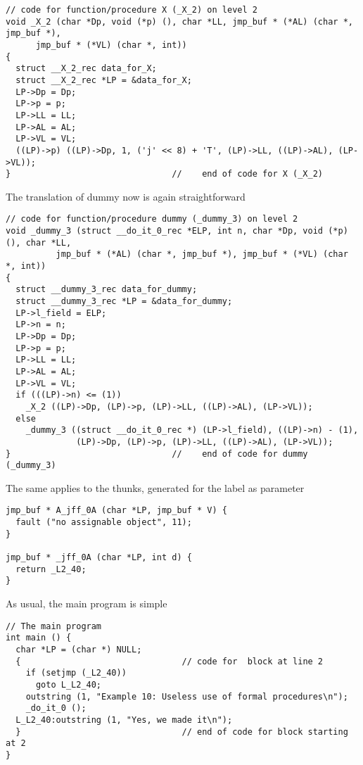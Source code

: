 \documentclass[11pt]{article}
\begin{document}
{\footnotesize
\begin{verbatim}
// code for function/procedure X (_X_2) on level 2
void _X_2 (char *Dp, void (*p) (), char *LL, jmp_buf * (*AL) (char *, jmp_buf *),
      jmp_buf * (*VL) (char *, int))
{
  struct __X_2_rec data_for_X;
  struct __X_2_rec *LP = &data_for_X;
  LP->Dp = Dp;
  LP->p = p;
  LP->LL = LL;
  LP->AL = AL;
  LP->VL = VL;
  ((LP)->p) ((LP)->Dp, 1, ('j' << 8) + 'T', (LP)->LL, ((LP)->AL), (LP->VL));
}                                //    end of code for X (_X_2)
\end{verbatim}
}
The translation of dummy now is again straightforward
{\footnotesize
\begin{verbatim}
// code for function/procedure dummy (_dummy_3) on level 2
void _dummy_3 (struct __do_it_0_rec *ELP, int n, char *Dp, void (*p) (), char *LL,
          jmp_buf * (*AL) (char *, jmp_buf *), jmp_buf * (*VL) (char *, int))
{
  struct __dummy_3_rec data_for_dummy;
  struct __dummy_3_rec *LP = &data_for_dummy;
  LP->l_field = ELP;
  LP->n = n;
  LP->Dp = Dp;
  LP->p = p;
  LP->LL = LL;
  LP->AL = AL;
  LP->VL = VL;
  if (((LP)->n) <= (1))
    _X_2 ((LP)->Dp, (LP)->p, (LP)->LL, ((LP)->AL), (LP->VL));
  else
    _dummy_3 ((struct __do_it_0_rec *) (LP->l_field), ((LP)->n) - (1),
              (LP)->Dp, (LP)->p, (LP)->LL, ((LP)->AL), (LP->VL));
}                                //    end of code for dummy (_dummy_3)
\end{verbatim}
}
The same applies to the thunks, generated for the label as parameter
{\footnotesize
\begin{verbatim}
jmp_buf * A_jff_0A (char *LP, jmp_buf * V) {
  fault ("no assignable object", 11);
}

jmp_buf * _jff_0A (char *LP, int d) {
  return _L2_40;
}
\end{verbatim}
}
As usual, the main program is simple
{\footnotesize
\begin{verbatim}
// The main program
int main () {
  char *LP = (char *) NULL;
  {                                // code for  block at line 2 
    if (setjmp (_L2_40))
      goto L_L2_40;
    outstring (1, "Example 10: Useless use of formal procedures\n");
    _do_it_0 ();
  L_L2_40:outstring (1, "Yes, we made it\n");
  }                                // end of code for block starting at 2
}
\end{verbatim}
}
\end{document}
